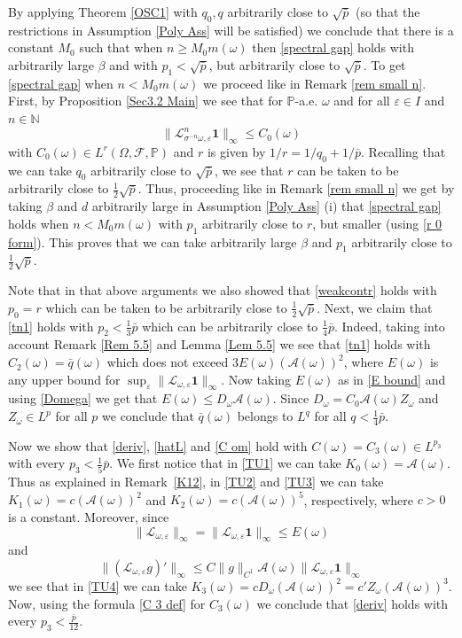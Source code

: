 \documentclass[11pt,reqno,a4paper]{article}
\theoremstyle{special}
\def\om{\omega}
\begin{document}
By applying Theorem \ref{OSC1} with $q_0,q$ arbitrarily close to $\sqrt{\bar p}$ (so that the restrictions in Assumption \ref{Poly Ass} will be satisfied)  we conclude that there is a constant $M_0$ such that when $n\geq M_0m(\om)$ then \eqref{spectral gap} holds with arbitrarily large $\beta$ and with $p_1<\sqrt{\bar p}$, but arbitrarily close to $\sqrt{\bar p}$. To get \eqref{spectral gap} when $n<M_0m(\om)$ we proceed like in Remark \ref{rem small n}. First, by Proposition \ref{Sec3.2 Main} we see that for $\mathbb P$-a.e. $\om$ and for all $\varepsilon\in I$ and $n\in\mathbb N$
\begin{equation}\label{C 0 }
\|\mathcal L_{\sigma^{-n}\om,\varepsilon}^n\textbf{1}\|_{\infty}\leq C_0(\om)  
\end{equation}
with $C_0(\om)\in L^r(\Omega,\mathcal F,\mathbb P)$ and $r$ is given by $1/r=1/q_0+1/\bar p$. Recalling that we can take $q_0$ arbitrarily close to $\sqrt{\bar p}$, we see that $r$ can be taken to be arbitrarily close to $\frac12\sqrt{\bar p}$. Thus, proceeding like in Remark \ref{rem small n} we get by taking $\beta$ and $d$ arbitrarily large in Assumption \ref{Poly Ass} (i) that \eqref{spectral gap} holds when $n<M_0m(\om)$ with $p_1$  arbitrarily  close to $r$, but smaller (using \eqref{r 0 form}). This proves that we can take arbitrarily large $\beta$ and $p_1$  arbitrarily close to $\frac12\sqrt{\bar p}$.

Note that in that above arguments we also showed that \eqref{weakcontr} holds with $p_0=r$ which can be taken to be arbitrarily close to $\frac12\sqrt{\bar p}$. Next, we claim that \eqref{tn1} holds with $p_2<\frac13\bar p$ which can be arbitrarily close to $\frac14\bar p$. Indeed, taking into account Remark \ref{Rem 5.5} and Lemma \ref{Lem 5.5} we see that \eqref{tn1}  holds with $C_2(\om)=\bar q(\om)$ which does not exceed $3E(\om)(\mathcal A(\om))^{2}$, where $E(\om)$ is any upper bound for 
$\sup_\varepsilon\|\mathcal L_{\om,\varepsilon}\textbf{1}\|_\infty$.
Now   taking $E(\om)$ as in \eqref{E bound} and using \eqref{Domega} we get that $E(\om)\leq D_\om \mathcal A(\om)$. Since $D_\om=C_0\mathcal A(\om)Z_\om$ and $Z_\om\in L^p$ for all $p$ we conclude that $\bar q(\om)$ belongs to $L^{q}$ for all $q<\frac 14\bar p$. 




Now we show that \eqref{deriv}, \eqref{hatL} and \eqref{C om} hold with $C(\om)=C_3(\om)\in L^{p_3}$ with every $p_3<\frac15\bar p$. 
We first notice that in \eqref{TU1} we can take $K_0(\om)=\mathcal A(\om)$. Thus as explained   in Remark~\ref{K12}, in   \eqref{TU2} and \eqref{TU3} we can take $K_1(\om)=c(\mathcal A(\om))^2$ and $K_2(\om)=c(\mathcal A(\om))^5$, respectively, where $c>0$ is a constant. Moreover, since 
$$
\|\mathcal L_{\om,\varepsilon}\|_\infty=\|\mathcal L_{\om,\varepsilon}\textbf{1}\|_\infty\leq E(\om)
$$
and 
$$
\|(\mathcal L_{\om,\varepsilon}g)'\|_\infty\leq C\|g\|_{C^1}\mathcal A(\om)\|\mathcal L_{\om,\varepsilon}\textbf{1}\|_\infty
$$
we see that in \eqref{TU4} we can take $K_3(\om)=cD_\om (\mathcal A(\om))^2=c'Z_\om (\mathcal A(\om))^3$. Now, using the formula \eqref{C 3 def} for $C_3(\om)$ we conclude that \eqref{deriv} holds with every $p_3<\frac{\bar p}{12}$.
\end{document}

